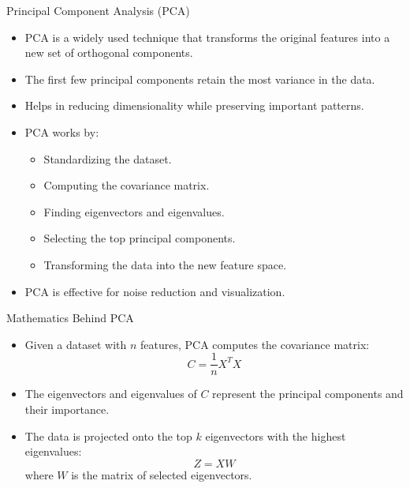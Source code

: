 \documentclass[11pt]{beamer}
\begin{document}
%
%
\begin{frame}{Principal Component Analysis (PCA)}
    \begin{itemize}
        \item PCA is a widely used technique that transforms the original features into a new set of orthogonal components.
        \item The first few principal components retain the most variance in the data.
        \item Helps in reducing dimensionality while preserving important patterns.
        \item PCA works by:
        \begin{itemize}
            \item Standardizing the dataset.
            \item Computing the covariance matrix.
            \item Finding eigenvectors and eigenvalues.
            \item Selecting the top principal components.
            \item Transforming the data into the new feature space.
        \end{itemize}
        \item PCA is effective for noise reduction and visualization.
    \end{itemize}
\end{frame}
%
%
\begin{frame}{Mathematics Behind PCA}
    \begin{itemize}
        \item Given a dataset with $n$ features, PCA computes the covariance matrix:
        \begin{equation}
        C = \frac{1}{n} X^T X
        \end{equation}
        \item The eigenvectors and eigenvalues of $C$ represent the principal components and their importance.
        \item The data is projected onto the top $k$ eigenvectors with the highest eigenvalues:
        \begin{equation}
        Z = X W
        \end{equation}
        where $W$ is the matrix of selected eigenvectors.
    \end{itemize}
\end{frame}
\end{document}
